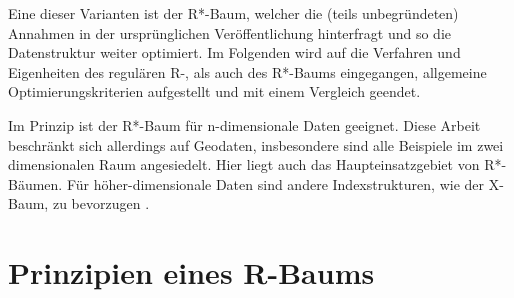 \documentclass[runningheads,a4paper]{llncs}
\begin{document}
	Eine dieser Varianten ist der R*-Baum, welcher die (teils unbegründeten) Annahmen in der ursprünglichen Veröffentlichung hinterfragt und so die Datenstruktur weiter optimiert. Im Folgenden wird auf die Verfahren und Eigenheiten des regulären R-, als auch des R*-Baums eingegangen, allgemeine Optimierungskriterien aufgestellt und mit einem Vergleich geendet.

	Im Prinzip ist der R*-Baum für n-dimensionale Daten geeignet. Diese Arbeit beschränkt sich allerdings auf Geodaten, insbesondere sind alle Beispiele im zwei dimensionalen Raum angesiedelt. Hier liegt auch das Haupteinsatzgebiet von R*-Bäumen. Für höher-dimensionale Daten sind andere Indexstrukturen, wie der X-Baum, zu bevorzugen \citep[vgl.][28-29]{Kriegel:1996}.


\section{Prinzipien eines R-Baums} %
\label{sec:prinzipien_eines_r_baums}
\end{document}
